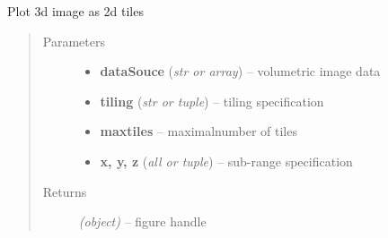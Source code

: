 \documentclass[letterpaper,10pt,english]{sphinxmanual}
\begin{document}
\begin{fulllineitems}
\label{api/ClearMap.Visualization:ClearMap.Visualization.Plot.plotTiling}
Plot 3d image as 2d tiles
\begin{quote}\begin{description}
\item[{Parameters}] \leavevmode\begin{itemize}
\item {} 
\textbf{dataSouce} (\emph{str or array}) --
volumetric image data

\item {} 
\textbf{tiling} (\emph{str or tuple}) --
tiling specification

\item {} 
\textbf{maxtiles} --
maximalnumber of tiles

\item {} 
\textbf{x, y, z} (\emph{all or tuple}) --
sub-range specification

\end{itemize}

\item[{Returns}] \leavevmode
\emph{(object)} --
figure handle

\end{description}\end{quote}

\end{fulllineitems}

\end{document}
